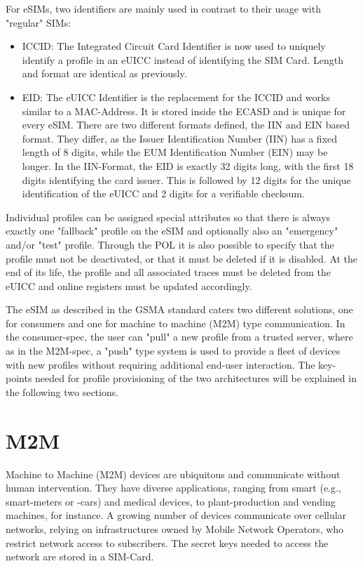 For eSIMs, two identifiers are mainly used in contrast to their usage with "regular" SIMs:
\begin{itemize}
    \item ICCID: The Integrated Circuit Card Identifier is now used to uniquely identify a profile in an eUICC instead of identifying the SIM Card. Length and format are identical as previously.
    \item EID: The eUICC Identifier is the replacement for the ICCID and works similar to a MAC-Address. It is stored inside the ECASD and is unique for every eSIM. There are two different formats defined, the IIN and EIN based format. They differ, as the Issuer Identification Number (IIN) has a fixed length of 8 digits, while the EUM Identification Number (EIN) may be longer. In the IIN-Format, the EID is exactly 32 digits long, with the first 18 digits identifying the card issuer. This is followed by 12 digits for the unique identification of the eUICC and 2 digits for a verifiable checksum.
\end{itemize}

Individual profiles can be assigned special attributes so that there is always exactly one "fallback" profile on the eSIM and optionally also an "emergency" and/or "test" profile. Through the POL it is also possible to specify that the profile must not be deactivated, or that it must be deleted if it is disabled. At the end of its life, the profile and all associated traces must be deleted from the eUICC and online registers must be updated accordingly.

The eSIM as described in the GSMA standard caters two different solutions, one for consumers \parencite{SGP:21} and one for machine to machine (M2M) \parencite{SGP:01} type communication. In the consumer-spec, the user can "pull" a new profile from a trusted server, where as in the M2M-spec, a "push" type system is used to provide a fleet of devices with new profiles without requiring additional end-user interaction. The key-points needed for profile provisioning of the two architectures will be explained in the following two sections.


\section{M2M}
Machine to Machine (M2M) devices are ubiquitous and communicate without human intervention. They have diverse applications, ranging from smart (e.g., smart-meters or -cars) and medical devices, to plant-production and vending machines, for instance. A growing number of devices communicate over cellular networks, relying on infrastructures owned by Mobile Network Operators, who restrict network access to subscribers. The secret keys needed to access the network are stored in a SIM-Card. 

